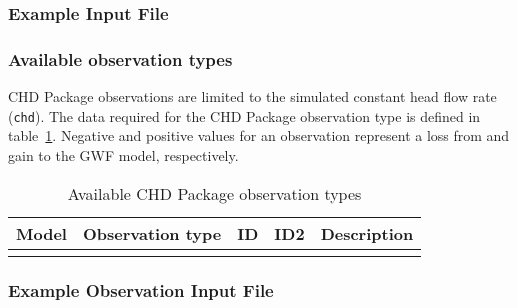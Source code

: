 \subsubsection{Example Input File}


\vspace{5mm}
\subsubsection{Available observation types}
CHD Package observations are limited to the simulated constant head flow rate (\texttt{chd}). The data required for the CHD Package observation type is defined in table~\ref{table:gwf-chdobstype}. Negative and positive values for an observation represent a loss from and gain to the GWF model, respectively.

\begin{longtable}{p{2cm} p{2.75cm} p{2cm} p{1.25cm} p{7cm}}
\caption{Available CHD Package observation types} \tabularnewline

\hline
\hline
\textbf{Model} & \textbf{Observation type} & \textbf{ID} & \textbf{ID2} & \textbf{Description} \\
\hline
\endhead

\hline
\endfoot


\label{table:gwf-chdobstype}
\end{longtable}

\vspace{5mm}
\subsubsection{Example Observation Input File}


